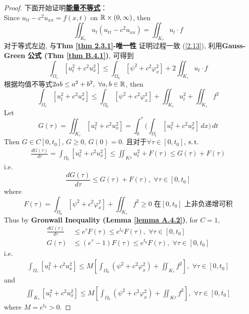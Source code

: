 	\begin{proof}
		下面开始证明\underline{\textbf{能量不等式}}：\\
		Since $u_{tt} - c^2 u_{xx} = f(x , t)$ on $\mathbb{R} \times (0 , \infty)$, then
		\[ \iint_{K_\tau} u_t(u_{tt} - c^2 u_{xx}) = \iint_{K_\tau} u_t \cdot f \]
		对于等式左边, 与\textbf{Thm \ref{thm 2.3.1}-唯一性} 证明过程一致 (\ref{2.13}), 利用\textbf{Gauss-Green 公式 (Thm \ref{thm B.4.1})}, 可得到
		\[ \int_{\Omega_\tau} [ u_{t}^2 + c^2 u_{x}^2 ] \leq \int_{\Omega_0} [ \psi^2 + c^2 \varphi_{x}^2 ] + 2\iint_{K_\tau} u_t \cdot f \]
		根据均值不等式$2ab \leq a^2 + b^2 , \,\, \forall a , b \in \mathbb{R}$, then
		\[ \int_{\Omega_\tau} [ u_{t}^2 + c^2 u_{x}^2 ] \leq \int_{\Omega_0} [ \psi^2 + c^2 \varphi_{x}^2 ] + \iint_{K_\tau} u_{t}^2 + \iint_{K_\tau} f^2 \]
		Let
		\[ G(\tau) = \iint_{K_\tau} [u_{t}^2 + c^2 u_{x}^2] = \int_{0}^\tau \Big( \int_{\Omega_t} [ u_{t}^2 + c^2 u_{x}^2 ] \, dx \Big) \, dt \]
		Then $G \in C[0 , t_0]$, $G \geq 0$, $G(0) = 0$. 且对于$\forall \tau \in [0 , t_0]$, $\operatorname{s.t.}$
		\begin{align*}
			\frac{dG(\tau)}{d\tau} = \int_{\Omega_0} [u_{t}^2 + c^2 u_{x}^2] 
			\leq \iint_{K\tau} u_{t}^2 + F(\tau) 
			\leq G(\tau) + F(\tau)
		\end{align*}
		i.e.
		\[ \frac{dG(\tau)}{d\tau} \leq G(\tau) + F(\tau) , \,\, \forall \tau \in [0 , t_0] \]
		where 
		\[ F(\tau) = \int_{\Omega_0} [\psi^2 + c^2 \varphi_{x}^2] + \iint_{K_\tau} f^2 \geq 0 \,\, \text{在$[0 , t_0]$ 上非负递增可积} \]
		Thus by \textbf{Gronwall Inequality (Lemma \ref{lemma A.4.2})}, for $C = 1$, 
		\begin{align*}
			\frac{dG(\tau)}{d\tau} &\leq e^{\tau} F(\tau) \leq e^{t_0} F(\tau) , \,\, \forall \tau \in [0 , t_0] \\
			G(\tau) &\leq ( e^{\tau} - 1 ) F(\tau) \leq e^{t_0} F(\tau) , \,\, \forall \tau \in [0 , t_0]
		\end{align*}
		i.e.
		\begin{align*}
			\int_{\Omega_\tau} [u_{t}^2 + c^2 u_{x}^2] 
			\leq M \left[ \int_{\Omega_0} ( \psi^2 + c^2 \varphi_{x}^2 ) + \iint_{K_\tau} f^2 \right] , \,\, \forall \tau \in [0 , t_0] 
		\end{align*}
		and
		\begin{align*}
			\iint_{K_\tau} [u_{t}^2 + c^2 u_{x}^2] 
			\leq M \left[ \int_{\Omega_0} (\psi^2 + c^2 \varphi_{x}^2) + \iint_{K\tau} f^2 \right] , \,\, \forall \tau \in [0 , t_0]
		\end{align*}
		where $M = e^{t_0} > 0$. 
	\end{proof}

